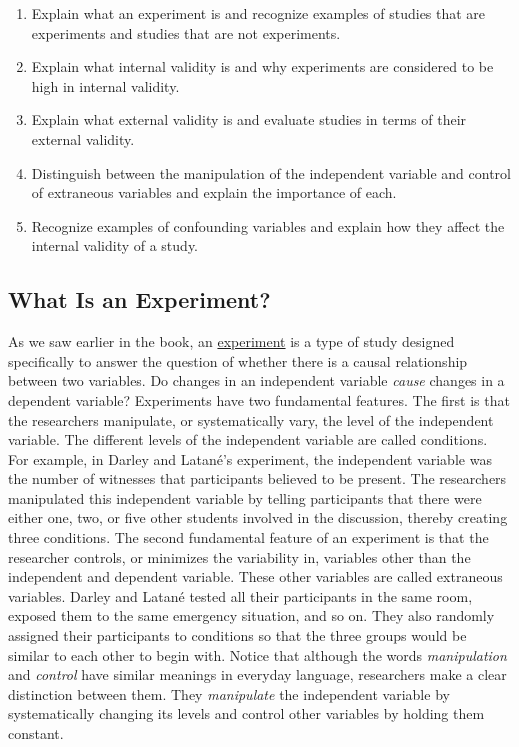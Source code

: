 \documentclass[
]{krantz}
\providecommand{\tightlist}{%
  \setlength{\itemsep}{0pt}\setlength{\parskip}{0pt}}
\begin{document}
\begin{enumerate}
\def\labelenumi{\arabic{enumi}.}
\tightlist
\item
  Explain what an experiment is and recognize examples of studies that are experiments and studies that are not experiments.
\item
  Explain what internal validity is and why experiments are considered to be high in internal validity.
\item
  Explain what external validity is and evaluate studies in terms of their external validity.
\item
  Distinguish between the manipulation of the independent variable and control of extraneous variables and explain the importance of each.
\item
  Recognize examples of confounding variables and explain how they affect the internal validity of a study.
\end{enumerate}

\hypertarget{what-is-an-experiment}{%
\subsection*{What Is an Experiment?}\label{what-is-an-experiment}}


As we saw earlier in the book, an \protect\hyperlink{experiment-2}{experiment} is a type of study designed specifically to answer the question of whether there is a causal relationship between two variables. Do changes in an independent variable \emph{cause} changes in a dependent variable? Experiments have two fundamental features. The first is that the researchers manipulate, or systematically vary, the level of the independent variable. The different levels of the independent variable are called conditions. For example, in Darley and Latané's experiment, the independent variable was the number of witnesses that participants believed to be present. The researchers manipulated this independent variable by telling participants that there were either one, two, or five other students involved in the discussion, thereby creating three conditions. The second fundamental feature of an experiment is that the researcher controls, or minimizes the variability in, variables other than the independent and dependent variable. These other variables are called extraneous variables. Darley and Latané tested all their participants in the same room, exposed them to the same emergency situation, and so on. They also randomly assigned their participants to conditions so that the three groups would be similar to each other to begin with. Notice that although the words \emph{manipulation} and \emph{control} have similar meanings in everyday language, researchers make a clear distinction between them. They \emph{manipulate} the independent variable by systematically changing its levels and control other variables by holding them constant.
\end{document}
